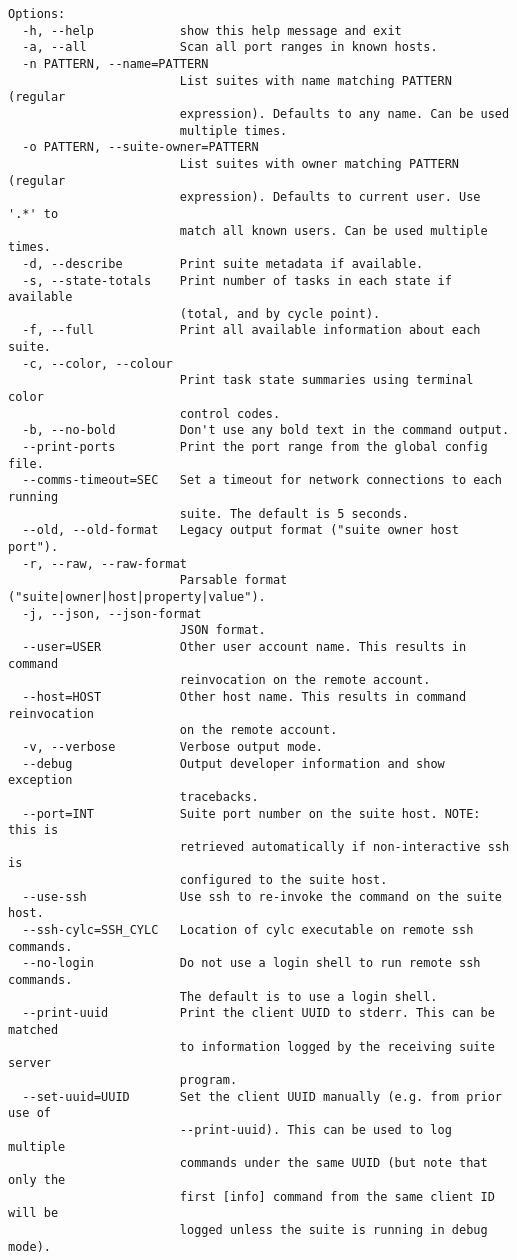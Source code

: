 \begin{lstlisting}
Options:
  -h, --help            show this help message and exit
  -a, --all             Scan all port ranges in known hosts.
  -n PATTERN, --name=PATTERN
                        List suites with name matching PATTERN (regular
                        expression). Defaults to any name. Can be used
                        multiple times.
  -o PATTERN, --suite-owner=PATTERN
                        List suites with owner matching PATTERN (regular
                        expression). Defaults to current user. Use '.*' to
                        match all known users. Can be used multiple times.
  -d, --describe        Print suite metadata if available.
  -s, --state-totals    Print number of tasks in each state if available
                        (total, and by cycle point).
  -f, --full            Print all available information about each suite.
  -c, --color, --colour
                        Print task state summaries using terminal color
                        control codes.
  -b, --no-bold         Don't use any bold text in the command output.
  --print-ports         Print the port range from the global config file.
  --comms-timeout=SEC   Set a timeout for network connections to each running
                        suite. The default is 5 seconds.
  --old, --old-format   Legacy output format ("suite owner host port").
  -r, --raw, --raw-format
                        Parsable format ("suite|owner|host|property|value").
  -j, --json, --json-format
                        JSON format.
  --user=USER           Other user account name. This results in command
                        reinvocation on the remote account.
  --host=HOST           Other host name. This results in command reinvocation
                        on the remote account.
  -v, --verbose         Verbose output mode.
  --debug               Output developer information and show exception
                        tracebacks.
  --port=INT            Suite port number on the suite host. NOTE: this is
                        retrieved automatically if non-interactive ssh is
                        configured to the suite host.
  --use-ssh             Use ssh to re-invoke the command on the suite host.
  --ssh-cylc=SSH_CYLC   Location of cylc executable on remote ssh commands.
  --no-login            Do not use a login shell to run remote ssh commands.
                        The default is to use a login shell.
  --print-uuid          Print the client UUID to stderr. This can be matched
                        to information logged by the receiving suite server
                        program.
  --set-uuid=UUID       Set the client UUID manually (e.g. from prior use of
                        --print-uuid). This can be used to log multiple
                        commands under the same UUID (but note that only the
                        first [info] command from the same client ID will be
                        logged unless the suite is running in debug mode).
\end{lstlisting}

